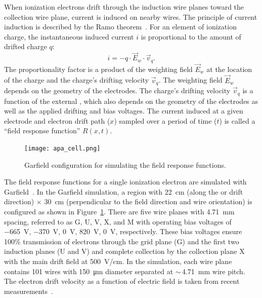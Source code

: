 When ionization electrons drift through the induction wire planes toward the collection wire plane, current is
induced on nearby wires. The principle of current induction is described by the Ramo theorem~\cite{Shockley1938,Ramo:1939vr}. 
For an element of ionization charge, the instantaneous induced current $i$ is proportional to the amount of drifted charge $q$: 
\begin{equation}\label{eq:shockley_ramo}
  i = - q \cdot \vec{E}_w \cdot \vec{v}_q.
\end{equation}
The proportionality factor is a product of the weighting field $\vec{E}_w$ at the location of the charge and 
the charge's drifting velocity $\vec{v}_q$. The weighting field $\vec{E}_w$ depends on the geometry of 
the electrodes. The charge's drifting velocity $\vec{v}_q$ is a function of the external \efield, which 
also depends on the geometry of the electrodes as well as the applied drifting and bias voltages. The current induced at a given electrode and electron drift path ($x$)
  sampled over a period of time ($t$) is called a ``field response function'' $R(x,t)$.

\begin{figure}[!htp]
\centering
\texttt{[image: apa\_cell.png]}
\caption[Garfield configuration for simulating the field response functions]{Garfield configuration for simulating the field response functions.}
\label{field_resp_geometry}
\end{figure}

The field response functions for a single ionization electron are simulated with Garfield~\cite{garfield}.  
In the Garfield simulation, a region with \SI{22}{cm} (along the \efield or drift direction) $\times$ 
\SI{30}{cm} (perpendicular to the field direction and wire orientation) is configured as shown in 
Figure~\ref{field_resp_geometry}. There are five wire planes with \SI{4.71}{mm} spacing, referred to as G, U, V, X, and 
M with operating bias voltages of \SI{-665}{V}, \SI{-370}{V}, \SI{0}{V}, \SI{820}{V}, \SI{0}{V}, respectively.  
These bias voltages ensure 100\% transmission of electrons through the grid plane (G) and the 
first two induction planes (U and V) and complete collection by the collection plane X with the main drift 
field at \SI{500}{V/cm}. In the simulation, each wire plane contains 101 wires with \SI{150}{\micro\meter} diameter
  separated at $\sim\,$\SI{4.71}{\mm} wire pitch. The electron drift velocity as a function of electric
  field is taken from recent measurements~\cite{Li:2015rqa,larpropertiesbnl}. 

